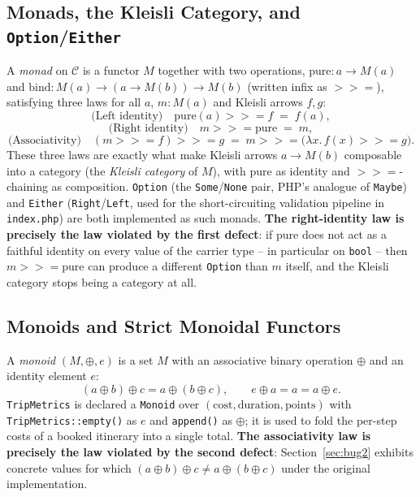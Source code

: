 \subsection{Monads, the Kleisli Category, and \texttt{Option}/\texttt{Either}}

A \emph{monad} on $\mathcal{C}$ is a functor $M$ together with two operations, $\mathrm{pure} : a \to M(a)$ and $\mathrm{bind} : M(a) \to (a \to M(b)) \to M(b)$ (written infix as $\mathbin{>\!\!>\!\!=}$), satisfying three laws for all $a$, $m : M(a)$ and Kleisli arrows $f,g$:
\[
  \text{(Left identity)}\quad \mathrm{pure}(a) \mathbin{>\!\!>\!\!=} f \;=\; f(a),
\]
\[
  \text{(Right identity)}\quad m \mathbin{>\!\!>\!\!=} \mathrm{pure} \;=\; m,
\]
\[
  \text{(Associativity)}\quad (m \mathbin{>\!\!>\!\!=} f) \mathbin{>\!\!>\!\!=} g \;=\; m \mathbin{>\!\!>\!\!=} \big(\lambda x.\, f(x) \mathbin{>\!\!>\!\!=} g\big).
\]
These three laws are exactly what make Kleisli arrows $a \to M(b)$ composable into a category (the \emph{Kleisli category} of $M$), with $\mathrm{pure}$ as identity and $\mathbin{>\!\!>\!\!=}$-chaining as composition. \texttt{Option} (the \texttt{Some}/\texttt{None} pair, PHP's analogue of \texttt{Maybe}) and \texttt{Either} (\texttt{Right}/\texttt{Left}, used for the short-circuiting validation pipeline in \texttt{index.php}) are both implemented as such monads. \textbf{The right-identity law is precisely the law violated by the first defect}: if $\mathrm{pure}$ does not act as a faithful identity on every value of the carrier type -- in particular on \texttt{bool} -- then $m \mathbin{>\!\!>\!\!=} \mathrm{pure}$ can produce a different \texttt{Option} than $m$ itself, and the Kleisli category stops being a category at all.

\subsection{Monoids and Strict Monoidal Functors}

A \emph{monoid} $(M, \oplus, e)$ is a set $M$ with an associative binary operation $\oplus$ and an identity element $e$:
\[
  (a \oplus b) \oplus c = a \oplus (b \oplus c), \qquad e \oplus a = a = a \oplus e.
\]
\texttt{TripMetrics} is declared a \texttt{Monoid} over $(\text{cost}, \text{duration}, \text{points})$ with \texttt{TripMetrics::empty()} as $e$ and \texttt{append()} as $\oplus$; it is used to fold the per-step costs of a booked itinerary into a single total. \textbf{The associativity law is precisely the law violated by the second defect}: Section~\ref{sec:bug2} exhibits concrete values for which $(a\oplus b)\oplus c \neq a\oplus(b\oplus c)$ under the original implementation.

